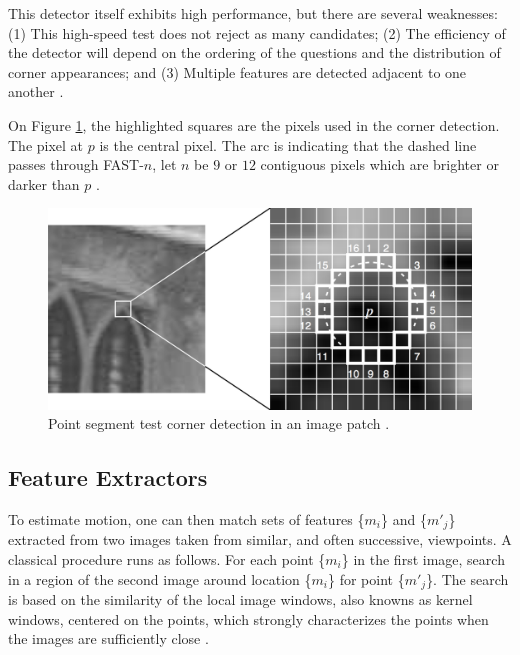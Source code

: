 This detector itself exhibits high performance, but there are several weaknesses: (1) This high-speed test does not reject as many candidates; (2) The efficiency of the detector will depend on the ordering of the questions and the distribution of corner appearances; and (3) Multiple features are detected adjacent to one another \cite{Rosten2010}.

On Figure \ref{figure:fast}, the highlighted squares are the pixels used in the corner detection. The pixel at $p$ is the central pixel. The arc is indicating that the dashed line passes through FAST-$n$, let $n$ be $9$ or $12$ contiguous pixels which are brighter or darker than $p$ \cite{Rosten2010}.

\begin{figure}[!htb]
  \centering
  \includegraphics[width=380pt]{chapters/tracking_library_for_the_web/fast.png}
  \caption{Point segment test corner detection in an image patch \cite{Glass2013}.}
  \label{figure:fast}
\end{figure}


\subsection{Feature Extractors} %
\label{sub:tracking_library_for_the_web:marker_less_tracking_algorithm:feature_extractors}

To estimate motion, one can then match sets of features \{$m_{i}$\} and \{$m'_{j}$\} extracted from two images taken from similar, and often successive, viewpoints. A classical procedure \cite{Calonder2010} runs as follows. For each point \{$m_{i}$\} in the first image, search in a region of the second image around location \{$m_{i}$\} for point \{$m'_{j}$\}. The search is based on the similarity of the local image windows, also knowns as kernel windows, centered on the points, which strongly characterizes the points when the images are sufficiently close \cite{Lepetit2005}.

